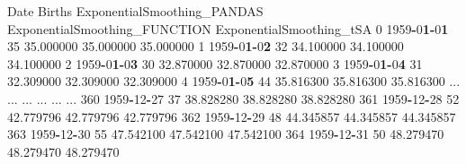 \documentclass[
]{book}
\newenvironment{Shaded}{\begin{snugshade}}{\end{snugshade}}
\newcommand{\DecValTok}[1]{\textcolor[rgb]{0.00,0.00,0.81}{#1}}
\newcommand{\ErrorTok}[1]{\textcolor[rgb]{0.64,0.00,0.00}{\textbf{#1}}}
\newcommand{\FloatTok}[1]{\textcolor[rgb]{0.00,0.00,0.81}{#1}}
\newcommand{\NormalTok}[1]{#1}
\newcommand{\OperatorTok}[1]{\textcolor[rgb]{0.81,0.36,0.00}{\textbf{#1}}}
\begin{document}
\begin{Shaded}
\begin{Highlighting}[]
\NormalTok{    Date        Births  ExponentialSmoothing\_PANDAS ExponentialSmoothing\_FUNCTION   ExponentialSmoothing\_tSA}
\DecValTok{0}   \DecValTok{1959}\OperatorTok{{-}}\DecValTok{0}\ErrorTok{1}\OperatorTok{{-}}\DecValTok{0}\ErrorTok{1}      \DecValTok{35}                    \FloatTok{35.000000}                     \FloatTok{35.000000}                  \FloatTok{35.000000}
\DecValTok{1}   \DecValTok{1959}\OperatorTok{{-}}\DecValTok{0}\ErrorTok{1}\OperatorTok{{-}}\DecValTok{0}\ErrorTok{2}      \DecValTok{32}                    \FloatTok{34.100000}                     \FloatTok{34.100000}                  \FloatTok{34.100000}
\DecValTok{2}   \DecValTok{1959}\OperatorTok{{-}}\DecValTok{0}\ErrorTok{1}\OperatorTok{{-}}\DecValTok{0}\ErrorTok{3}      \DecValTok{30}                    \FloatTok{32.870000}                     \FloatTok{32.870000}                  \FloatTok{32.870000}
\DecValTok{3}   \DecValTok{1959}\OperatorTok{{-}}\DecValTok{0}\ErrorTok{1}\OperatorTok{{-}}\DecValTok{0}\ErrorTok{4}      \DecValTok{31}                    \FloatTok{32.309000}                     \FloatTok{32.309000}                  \FloatTok{32.309000}
\DecValTok{4}   \DecValTok{1959}\OperatorTok{{-}}\DecValTok{0}\ErrorTok{1}\OperatorTok{{-}}\DecValTok{0}\ErrorTok{5}      \DecValTok{44}                    \FloatTok{35.816300}                     \FloatTok{35.816300}                  \FloatTok{35.816300}
\NormalTok{...        ...     ...                          ...                           ...                        ...}
\DecValTok{360} \DecValTok{1959}\OperatorTok{{-}}\DecValTok{12}\OperatorTok{{-}}\DecValTok{27}      \DecValTok{37}                    \FloatTok{38.828280}                     \FloatTok{38.828280}                  \FloatTok{38.828280}
\DecValTok{361} \DecValTok{1959}\OperatorTok{{-}}\DecValTok{12}\OperatorTok{{-}}\DecValTok{28}      \DecValTok{52}                    \FloatTok{42.779796}                     \FloatTok{42.779796}                  \FloatTok{42.779796}
\DecValTok{362} \DecValTok{1959}\OperatorTok{{-}}\DecValTok{12}\OperatorTok{{-}}\DecValTok{29}      \DecValTok{48}                    \FloatTok{44.345857}                     \FloatTok{44.345857}                  \FloatTok{44.345857}
\DecValTok{363} \DecValTok{1959}\OperatorTok{{-}}\DecValTok{12}\OperatorTok{{-}}\DecValTok{30}      \DecValTok{55}                    \FloatTok{47.542100}                     \FloatTok{47.542100}                  \FloatTok{47.542100}
\DecValTok{364} \DecValTok{1959}\OperatorTok{{-}}\DecValTok{12}\OperatorTok{{-}}\DecValTok{31}      \DecValTok{50}                    \FloatTok{48.279470}                     \FloatTok{48.279470}                  \FloatTok{48.279470}
\end{Highlighting}
\end{Shaded}
\end{document}
